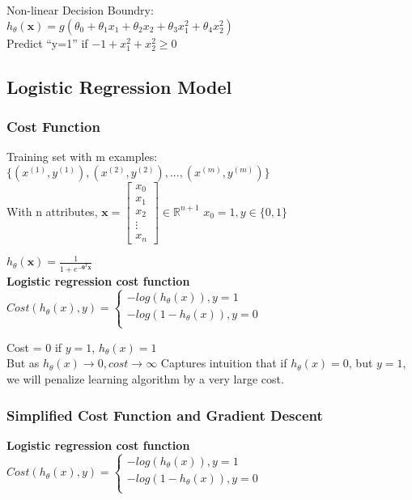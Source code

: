 \documentclass{article}
\newcommand{\vect}[1]{\boldsymbol{#1}}
\begin{document}
Non-linear Decision Boundry:\\
$h_\theta(\vect{x}) = g(\theta_0 + \theta_1 x_1 + \theta_2 x_2 + \theta_3 x_1^2 + \theta_4 x_2^2)$\\
Predict ``y=1'' if $-1 + x_1^2 + x_2^2 \ge 0$\\


\subsection{Logistic Regression Model}
\subsubsection{Cost Function}
Training set with m examples: $\{(x^{(1)}, y^{(1)}), (x^{(2)}, y^{(2)}), ...,  (x^{(m)}, y^{(m)})\}$\\

With n attributes, $\vect{x} = \begin{bmatrix}
x_0 \\ x_1 \\ x_2 \\ \vdots \\ x_n 
\end{bmatrix} \in \mathbb{R}^{n+1}$
$x_0 = 1, y \in \{0, 1\}$

$h_\theta(\vect{x}) = \frac{1}{1 + e^{-\vect{\theta}^T \vect{x}}}$ \\

\textbf{Logistic regression cost function} \\
$Cost(h_\theta(x), y)=\left\{
                \begin{array}{ll}
                  -log(h_\theta(x)), y = 1\\
                  -log(1 - h_\theta(x)), y = 0\\
                \end{array}
              \right.$

Cost = 0 if $y = 1$, $h_\theta(x) = 1$ \\
But as $h_\theta(x) \rightarrow 0, cost \rightarrow \infty $
Captures intuition that if $h_\theta(x) = 0$, but $y = 1$, we will penalize learning algorithm by a very large cost.\\

\newpage

\subsubsection{Simplified Cost Function and Gradient Descent}
\textbf{Logistic regression cost function} \\
$Cost(h_\theta(x), y)=\left\{
                \begin{array}{ll}
                  -log(h_\theta(x)), y = 1\\
                  -log(1 - h_\theta(x)), y = 0\\
                \end{array}
              \right.$\\
\end{document}
